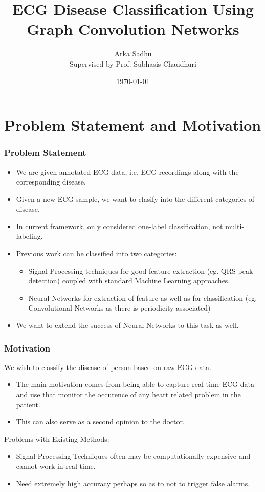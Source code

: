 \documentclass{beamer}
\title{ECG Disease Classification Using Graph Convolution Networks}
\author[Arka Sadhu]{Arka Sadhu \\ Supervised by Prof. Subhasis Chaudhuri}
\institute{IIT Bombay}
\date{\today}
\begin{document}


\begin{frame}
\titlepage
\end{frame}


\section{Problem Statement and Motivation}

\begin{frame}
  \frametitle{Problem Statement}
  \begin{itemize}
  \item We are given annotated ECG data, i.e. ECG recordings along with the corresponding disease.
  \item Given a new ECG sample, we want to clasify into the different categories of disease.
  \item In current framework, only considered one-label classification, not multi-labeling.
  \item Previous work can be classified into two categories:
    \begin{itemize}
    \item Signal Processing techniques for good feature extraction (eg. QRS peak detection) coupled with standard Machine Learning approaches.
    \item Neural Networks for extraction of feature as well as for classification (eg. Convolutional Networks as there is periodicity associated)
    \end{itemize}
  \item We want to extend the success of Neural Networks to this task as well.
  \end{itemize}
\end{frame}

\begin{frame}
  \frametitle{Motivation}
  We wish to classify the disease of person based on raw ECG data.
  \begin{itemize}
  \item The main motivation comes from being able to capture real time ECG data and use that monitor the occurence of any heart related problem in the patient.
  \item This can also serve as a second opinion to the doctor.
  \end{itemize}
  Problems with Existing Methods:
  \begin{itemize}
  \item Signal Processing Techniques often may be computationally expensive and cannot work in real time.
  \item Need extremely high accuracy perhaps so as to not to trigger false alarms.
  \end{itemize}
\end{frame}
\end{document}
